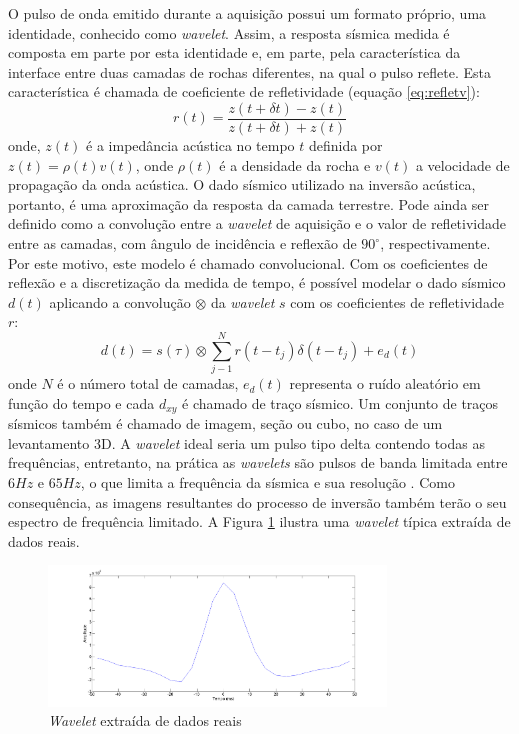 O pulso de onda emitido durante a aquisição possui um formato próprio, uma identidade, 
conhecido como \textit{wavelet}. Assim, a resposta sísmica medida
é composta em parte por esta identidade e, em parte, pela característica da interface
entre duas camadas de rochas diferentes, na qual o pulso reflete.
Esta característica é chamada de coeficiente de refletividade (equação \ref{eq:refletv}):
\begin{equation}
r(t) = \frac{z(t+\delta t)-z(t)}{z(t+\delta t)+z(t)}
\label{eq:refletv}
\end{equation}
onde, $z(t)$ é a impedância acústica no tempo $t$ definida por
$z(t)=\rho(t)v(t)$, onde $\rho(t)$ é a densidade da rocha e $v(t)$ a
velocidade de propagação da onda acústica.
O dado sísmico utilizado na inversão acústica, portanto,
é uma aproximação da resposta da camada terrestre. Pode ainda ser definido como
a convolução entre a \textit{wavelet} de aquisição e o valor de refletividade entre as
camadas, com ângulo de incidência e reflexão de $90^\circ$,
respectivamente. Por este motivo, este modelo é chamado convolucional.
Com os coeficientes de reflexão e a discretização da medida de tempo, é possível
modelar o dado sísmico $d(t)$ aplicando a convolução $\otimes$
da \textit{wavelet} $s$ com os coeficientes de refletividade $r$:
\begin{equation}
d(t) = s(\tau) \otimes \sum_{j-1}^{N}{r(t- t_j) \delta(t - t_j) + e_d(t)}
\end{equation}
onde $N$ é o número total de camadas, $e_d(t)$ representa o ruído aleatório em função do tempo
e cada $d_{xy}$ é chamado de traço sísmico. Um conjunto de traços
sísmicos também é chamado de imagem, seção ou cubo, no caso de um
levantamento 3D. A \textit{wavelet} ideal seria um pulso tipo delta contendo
todas as frequências, entretanto, na prática as
\textit{wavelets} são pulsos de banda limitada entre $6Hz$ e $65Hz$, o que
limita a frequência da sísmica e sua resolução \citep[p. 11]{sen_livro}.
Como consequência, as imagens resultantes do processo de inversão também terão
o seu espectro de frequência limitado. A Figura \ref{fig:wavelet} ilustra uma
\textit{wavelet} típica extraída de dados reais.
\begin{figure}[htp]
\begin{center}
  \includegraphics[width=0.8\textwidth]{fig/wavelet}
  \caption{\textit{Wavelet} extraída de dados reais}
  \label{fig:wavelet}
\end{center}
\end{figure}

